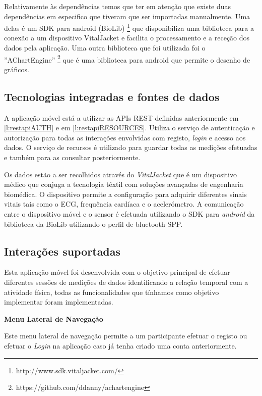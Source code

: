 Relativamente às dependências temos que ter em atenção que existe duas dependências em especifico que tiveram que ser importadas manualmente. Uma delas é um \gls{SDK} para android (BioLib) \footnote{http://www.sdk.vitaljacket.com/} que disponibiliza uma biblioteca para a conexão a um dispositivo VitalJacket e facilita o processamento e a receção dos dados pela aplicação. Uma outra biblioteca que foi utilizada foi o ''AChartEngine'' \footnote{https://github.com/ddanny/achartengine} que é uma biblioteca para android que permite o desenho de gráficos.




\subsection{Tecnologias integradas e fontes de dados}
A aplicação móvel está a utilizar as \gls{API}s \gls{REST} definidas anteriormente em \ref{l:restapiAUTH} e em \ref{l:restapiRESOURCES}. Utiliza o serviço de autenticação e autorização para todas as interações envolvidas com registo, \textit{login} e acesso aos dados. O serviço de recursos é utilizado para guardar todas as medições efetuadas e também para as consultar posteriormente.\par 
Os dados estão a ser recolhidos através do \textit{VitalJacket} que é um dispositivo médico que conjuga a tecnologia têxtil com soluções avançadas de engenharia biomédica. O dispositivo permite a configuração para adquirir diferentes sinais vitais tais como o \gls{ECG}, frequência cardíaca e o acelerómetro. A comunicação entre o dispositivo móvel e o sensor é efetuada utilizando o \gls{SDK} para \textit{android} da biblioteca da BioLib utilizando o perfil de bluetooth \gls{SPP}.



\subsection{Interações suportadas }
Esta aplicação móvel foi desenvolvida com o objetivo principal de efetuar diferentes sessões de medições de dados identificando a relação temporal com a atividade física, todas as funcionalidades que tínhamos como objetivo implementar foram implementadas.


\par
\textbf{Menu Lateral de Navegação}
\par
Este menu lateral de navegação permite a um participante efetuar o registo ou efetuar o \textit{Login} na aplicação caso já tenha criado uma conta anteriormente.

